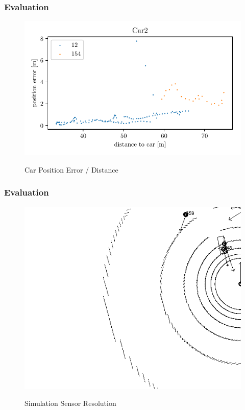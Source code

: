 \documentclass[nosymbols]{beamer}	%
\begin{document}
\begin{frame}
\frametitle{Evaluation}
\begin{figure}[!ht]
\begin{center}
\caption{Car Position Error / Distance}
\includegraphics[width=\textwidth,height=0.7\textheight,keepaspectratio]{bilder/Car2_pos_err_dist.pdf}
\label{obst_cases}
\end{center}
\end{figure}
\end{frame}


\begin{frame}
\frametitle{Evaluation}
\begin{figure}[!ht]
\begin{center}
\caption{Simulation Sensor Resolution}
\includegraphics[width=\textwidth,height=0.7\textheight,keepaspectratio]{bilder/sen_err.png}
\label{obst_cases}
\end{center}
\end{figure}
\end{frame}
\end{document}
